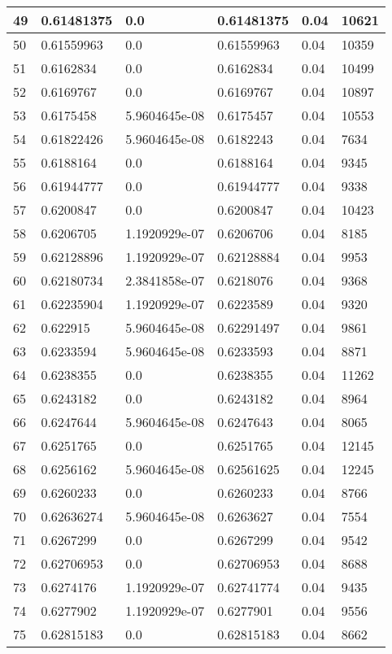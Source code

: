 \begin{longtable}{|l|l|l|l|l|l|}
49 & 0.61481375 & 0.0 & 0.61481375 & 0.04 & 10621 \\ \hline 
50 & 0.61559963 & 0.0 & 0.61559963 & 0.04 & 10359 \\ \hline 
51 & 0.6162834 & 0.0 & 0.6162834 & 0.04 & 10499 \\ \hline 
52 & 0.6169767 & 0.0 & 0.6169767 & 0.04 & 10897 \\ \hline 
53 & 0.6175458 & 5.9604645e-08 & 0.6175457 & 0.04 & 10553 \\ \hline 
54 & 0.61822426 & 5.9604645e-08 & 0.6182243 & 0.04 & 7634 \\ \hline 
55 & 0.6188164 & 0.0 & 0.6188164 & 0.04 & 9345 \\ \hline 
56 & 0.61944777 & 0.0 & 0.61944777 & 0.04 & 9338 \\ \hline 
57 & 0.6200847 & 0.0 & 0.6200847 & 0.04 & 10423 \\ \hline 
58 & 0.6206705 & 1.1920929e-07 & 0.6206706 & 0.04 & 8185 \\ \hline 
59 & 0.62128896 & 1.1920929e-07 & 0.62128884 & 0.04 & 9953 \\ \hline 
60 & 0.62180734 & 2.3841858e-07 & 0.6218076 & 0.04 & 9368 \\ \hline 
61 & 0.62235904 & 1.1920929e-07 & 0.6223589 & 0.04 & 9320 \\ \hline 
62 & 0.622915 & 5.9604645e-08 & 0.62291497 & 0.04 & 9861 \\ \hline 
63 & 0.6233594 & 5.9604645e-08 & 0.6233593 & 0.04 & 8871 \\ \hline 
64 & 0.6238355 & 0.0 & 0.6238355 & 0.04 & 11262 \\ \hline 
65 & 0.6243182 & 0.0 & 0.6243182 & 0.04 & 8964 \\ \hline 
66 & 0.6247644 & 5.9604645e-08 & 0.6247643 & 0.04 & 8065 \\ \hline 
67 & 0.6251765 & 0.0 & 0.6251765 & 0.04 & 12145 \\ \hline 
68 & 0.6256162 & 5.9604645e-08 & 0.62561625 & 0.04 & 12245 \\ \hline 
69 & 0.6260233 & 0.0 & 0.6260233 & 0.04 & 8766 \\ \hline 
70 & 0.62636274 & 5.9604645e-08 & 0.6263627 & 0.04 & 7554 \\ \hline 
71 & 0.6267299 & 0.0 & 0.6267299 & 0.04 & 9542 \\ \hline 
72 & 0.62706953 & 0.0 & 0.62706953 & 0.04 & 8688 \\ \hline 
73 & 0.6274176 & 1.1920929e-07 & 0.62741774 & 0.04 & 9435 \\ \hline 
74 & 0.6277902 & 1.1920929e-07 & 0.6277901 & 0.04 & 9556 \\ \hline 
75 & 0.62815183 & 0.0 & 0.62815183 & 0.04 & 8662 \\ \hline 
\end{longtable}
